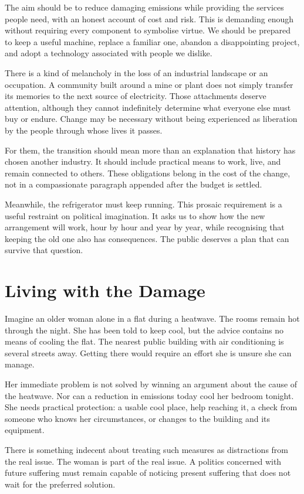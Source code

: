 \documentclass[12pt,a4paper]{book}
\begin{document}
The aim should be to reduce damaging emissions while providing the services people need, with an honest account of cost and risk. This is demanding enough without requiring every component to symbolise virtue. We should be prepared to keep a useful machine, replace a familiar one, abandon a disappointing project, and adopt a technology associated with people we dislike.

There is a kind of melancholy in the loss of an industrial landscape or an occupation. A community built around a mine or plant does not simply transfer its memories to the next source of electricity. Those attachments deserve attention, although they cannot indefinitely determine what everyone else must buy or endure. Change may be necessary without being experienced as liberation by the people through whose lives it passes.

For them, the transition should mean more than an explanation that history has chosen another industry. It should include practical means to work, live, and remain connected to others. These obligations belong in the cost of the change, not in a compassionate paragraph appended after the budget is settled.

Meanwhile, the refrigerator must keep running. This prosaic requirement is a useful restraint on political imagination. It asks us to show how the new arrangement will work, hour by hour and year by year, while recognising that keeping the old one also has consequences. The public deserves a plan that can survive that question.

\chapter{Living with the Damage}

Imagine an older woman alone in a flat during a heatwave. The rooms remain hot through the night. She has been told to keep cool, but the advice contains no means of cooling the flat. The nearest public building with air conditioning is several streets away. Getting there would require an effort she is unsure she can manage.

Her immediate problem is not solved by winning an argument about the cause of the heatwave. Nor can a reduction in emissions today cool her bedroom tonight. She needs practical protection: a usable cool place, help reaching it, a check from someone who knows her circumstances, or changes to the building and its equipment.

There is something indecent about treating such measures as distractions from the real issue. The woman is part of the real issue. A politics concerned with future suffering must remain capable of noticing present suffering that does not wait for the preferred solution.
\end{document}
